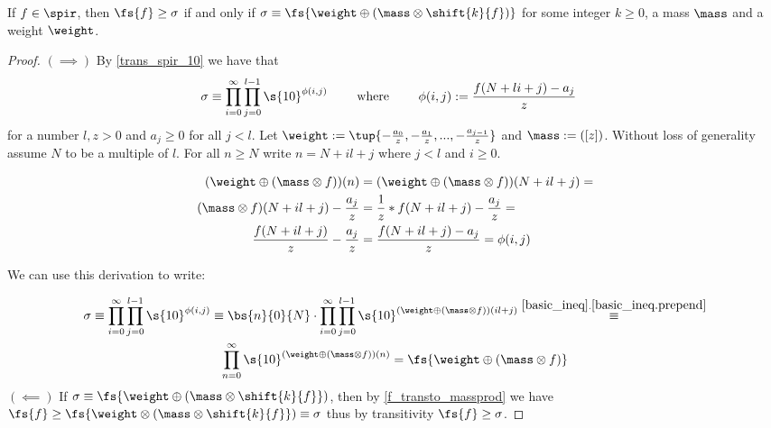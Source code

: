 
\begin{theorem}\label{mass_product_spir}
	If $f\in\spir$, then $\fs{f} \geq \sigma$ if and only if $\sigma \equiv \fs{\weight\oplus(\mass\otimes \shift{k}{f})}$ for some integer $k\geq0$, a mass $\mass$ and a weight $\weight$.
	\begin{proof}{$(\implies)$}
		By \cref{trans_spir_10} we have that
		\begin{align*}
			\sigma &\equiv \prod_{i=0}^{\infty}\prod_{j=0}^{l-1} \s{10}^{\phi(i,j)}
			\qquad \text{ where } \qquad
			\phi(i,j) := \frac{f(N + li + j) - a_j}{z}
		\end{align*}
		for a number $l,z>0$ and $a_j\geq0$ for all $j<l$.
		Let $\weight := \tup{-\frac{a_0}{z},-\frac{a_1}{z},...,-\frac{a_{j-1}}{z}}$ and $\mass := ([z])$. Without loss of generality assume $N$ to be a multiple of $l$.
		For all $n\geq N$ write $n = N + il + j$ where $j<l$ and $i\geq 0$.

		\begin{align*}
			(\weight \oplus (\mass\otimes f))(n) &= 
			(\weight \oplus (\mass\otimes f))(N + il + j) = \\
			(\mass\otimes f)(N + il + j) - \frac{a_j}{z} &= 
			\frac{1}{z}*f(N + il + j) - \frac{a_j}{z} = \\
			\frac{f(N + il + j) }{z} - \frac{a_j}{z} &= 
			\frac{f(N + il + j) - a_j}{z} =
			\phi(i,j)
		\end{align*}

		We can use this derivation to write:

		\begin{gather*}
			\sigma \equiv \prod_{i=0}^{\infty}\prod_{j=0}^{l-1} \s{10}^{\phi(i,j)} \equiv  
			\bs{n}{0}{N}\cdot\prod_{i=0}^{\infty}\prod_{j=0}^{l-1} \s{10}^{(\weight \oplus (\mass \otimes f))(il + j)} \overset{\ref{basic_ineq}.\ref{basic_ineq.prepend}}{\equiv} \\ 
			\prod_{n=0}^{\infty} \s{10}^{(\weight \oplus (\mass \otimes f))(n)} = 
			\fs{\weight \oplus (\mass \otimes f)}
		\end{gather*}
		$(\impliedby)$
		If $\sigma \equiv \fs{\weight \oplus (\mass \otimes \shift{k}{f}})$, then by \cref{f_transto_massprod} we have $\fs{f} \geq \fs{\weight \otimes (\mass \otimes \shift{k}{f}}) \equiv \sigma$ thus by transitivity $\fs{f} \geq \sigma$.
	\end{proof}
\end{theorem}
